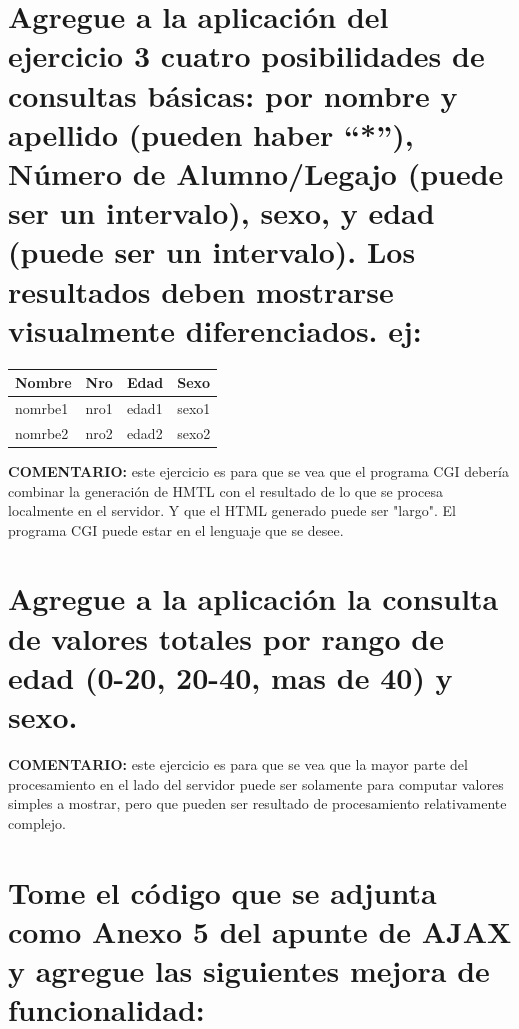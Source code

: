 \documentclass[12pt]{extarticle}
\begin{document}
    \section{Agregue a la aplicación del ejercicio 3 cuatro posibilidades de
consultas básicas: por nombre y apellido (pueden haber ``*''), Número de
Alumno/Legajo (puede ser un intervalo), sexo, y edad (puede ser un
intervalo). Los resultados deben mostrarse visualmente diferenciados.
ej:}\label{agregue-a-la-aplicaciuxf3n-del-ejercicio-3-cuatro-posibilidades-de-consultas-buxe1sicas-por-nombre-y-apellido-pueden-haber-nuxfamero-de-alumnolegajo-puede-ser-un-intervalo-sexo-y-edad-puede-ser-un-intervalo.-los-resultados-deben-mostrarse-visualmente-diferenciados.-ej}

\begin{longtable}[]{@{}llll@{}}
\toprule
Nombre & Nro & Edad & Sexo\tabularnewline
\midrule
\endhead
nomrbe1 & nro1 & edad1 & sexo1\tabularnewline
nomrbe2 & nro2 & edad2 & sexo2\tabularnewline
\bottomrule
\end{longtable}

\textbf{COMENTARIO:} este ejercicio es para que se vea que el programa
CGI debería combinar la generación de HMTL con el resultado de lo que se
procesa localmente en el servidor. Y que el HTML generado puede ser
"largo". El programa CGI puede estar en el lenguaje que se desee.

    \section{Agregue a la aplicación la consulta de valores totales por
rango de edad (0-20, 20-40, mas de 40) y
sexo.}\label{agregue-a-la-aplicaciuxf3n-la-consulta-de-valores-totales-por-rango-de-edad-0-20-20-40-mas-de-40-y-sexo.}

\textbf{COMENTARIO:} este ejercicio es para que se vea que la mayor
parte del procesamiento en el lado del servidor puede ser solamente para
computar valores simples a mostrar, pero que pueden ser resultado de
procesamiento relativamente complejo.

    \section{Tome el código que se adjunta como Anexo 5 del apunte de AJAX y
agregue las siguientes mejora de
funcionalidad:}\label{tome-el-cuxf3digo-que-se-adjunta-como-anexo-5-del-apunte-de-ajax-y-agregue-las-siguientes-mejora-de-funcionalidad}
\end{document}
